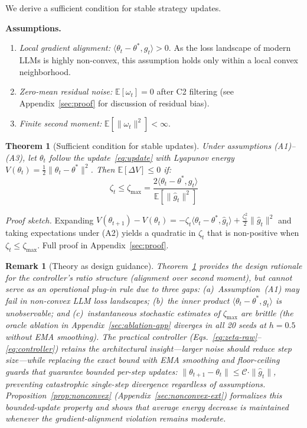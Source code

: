 \documentclass{article}
\newtheorem{theorem}{Theorem}
\newtheorem{remark}{Remark}
\begin{document}
We derive a sufficient condition for stable strategy updates.

\textbf{Assumptions.}
\begin{enumerate}
  \item[(A1)] \emph{Local gradient alignment:}
    $\langle \theta_t - \theta^*, g_t \rangle > 0$. As the loss landscape of modern LLMs is highly non-convex, this assumption holds only within a local convex neighborhood.
  \item[(A2)] \emph{Zero-mean residual noise:}
    $\mathbb{E}[\omega_t] = 0$ after C2 filtering (see
    Appendix~\ref{sec:proof} for discussion of residual bias).
  \item[(A3)] \emph{Finite second moment:}
    $\mathbb{E}[\|\omega_t\|^2] < \infty$.
\end{enumerate}

\begin{theorem}[Sufficient condition for stable updates]
\label{thm:lyapunov}
Under assumptions (A1)--(A3), let $\theta_t$ follow the
update~\eqref{eq:update} with Lyapunov energy
$V(\theta_t) = \tfrac{1}{2}\|\theta_t - \theta^*\|^2$.
Then $\mathbb{E}[\Delta V] \leq 0$ if:
\begin{equation}
  \zeta_t \leq \zeta_{\max} = \frac{2\langle \theta_t - \theta^*,
    g_t \rangle}{\mathbb{E}[\|\hat{g}_t\|^2]}
  \label{eq:zeta_max}
\end{equation}
\end{theorem}

\textit{Proof sketch.} Expanding
$V(\theta_{t+1}) - V(\theta_t) = -\zeta_t \langle \theta_t - \theta^*,
\hat{g}_t \rangle + \tfrac{\zeta_t^2}{2}\|\hat{g}_t\|^2$ and taking
expectations under (A2) yields a quadratic in $\zeta_t$ that is
non-positive when $\zeta_t \leq \zeta_{\max}$.
Full proof in Appendix~\ref{sec:proof}.

\begin{remark}[Theory as design guidance]
\label{rem:theory-practice}
Theorem~\ref{thm:lyapunov} provides the \emph{design rationale} for the controller's ratio structure (alignment over second moment), but cannot serve as an operational plug-in rule due to three gaps: (a)~Assumption~(A1) may fail in non-convex LLM loss landscapes; (b)~the inner product $\langle \theta_t{-}\theta^*, g_t \rangle$ is unobservable; and (c)~instantaneous stochastic estimates of $\zeta_{\max}$ are brittle (the oracle ablation in Appendix~\ref{sec:ablation-app} diverges in all 20 seeds at $h{=}0.5$ without EMA smoothing). The practical controller (Eqs.~\ref{eq:zeta-raw}--\ref{eq:controller}) retains the architectural insight---larger noise should reduce step size---while replacing the exact bound with EMA smoothing and floor-ceiling guards that guarantee bounded per-step updates: $\|\theta_{t+1} - \theta_t\| \leq \mathcal{C} \cdot \|\hat{g}_t\|$, preventing catastrophic single-step divergence regardless of assumptions. Proposition~\ref{prop:nonconvex} (Appendix~\ref{sec:nonconvex-ext}) formalizes this bounded-update property and shows that average energy decrease is maintained whenever the gradient-alignment violation remains moderate.
\end{remark}
\end{document}
